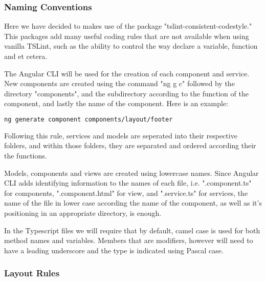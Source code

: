 \documentclass[11pt]{article}
\begin{document}
\subsubsection{Naming Conventions}

Here we have decided to makes use of the package "tslint-consistent-codestyle." This packages add many useful coding rules that are not available when using vanilla TSLint, such as the ability to control the way declare a variable, function and et cetera.\cite{Website:4}

The Angular CLI will be used for the creation of each component and service. New components are created using the command "ng g c" followed by the directory "components", and the subdirectory according to the function of the component, and lastly the name of the component. Here is an example:

\begin{lstlisting}[language=bash]
ng generate component components/layout/footer
\end{lstlisting}
Following this rule, services and models are seperated into their respective folders, and within those folders, they are separated and ordered according their the functions.\par
Models, components and views are created using lowercase names. Since Angular CLI adds identifying information to the names of each file, i.e. ".component.ts" for components, ".component.html" for view, and ".service.ts" for services, the name of the file in lower case according the name of the component, as well as it's positioning in an appropriate directory, is enough.\par


In the Typescript files we will require that by default, camel case is used for both method names and variables. Members that are modifiers, however will need to have a leading underscore and the type is indicated using Pascal case.


\subsubsection{Layout Rules}
\end{document}
